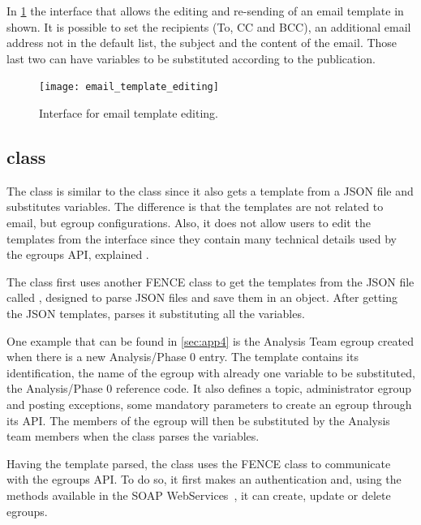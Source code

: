 In \cref{fig:email_template_editing} the interface that allows the editing and re-sending of an email template in shown. It is possible to set the recipients (To, CC and BCC), an additional email address not in the default list, the subject and the content of the email.
Those last two can have variables to be substituted according to the publication.

\begin{figure}[htb]
  \centering
  \texttt{[image: email\_template\_editing]}
  \caption{Interface for email template editing.}%
  \label{fig:email_template_editing}
\end{figure}


\subsection{ class}%
\label{sec:EgroupManager_class}

The  class is similar to the  class since it also gets a template from a JSON file and substitutes variables.
The difference is that the templates are not related to email, but egroup configurations.
Also, it does not allow users to edit the templates from the interface since they contain many technical details used by the egroups API, explained .

The  class first uses another FENCE class to get the templates from the JSON file called , designed to parse JSON files and save them in an object.
After getting the JSON templates,  parses it substituting all the variables.

One example that can be found in \cref{sec:app4} is the Analysis Team egroup created when there is a new Analysis/Phase 0 entry.
The template contains its identification, the name of the egroup with already one variable to be substituted, the Analysis/Phase 0 reference code.
It also defines a topic, administrator egroup and posting exceptions, some mandatory parameters to create an egroup through its API\@.
The members of the egroup will then be substituted by the Analysis team members when the  class parses the variables.

Having the template parsed, the  class uses the FENCE  class to communicate with the egroups API\@.
To do so, it first makes an authentication and, using the methods available in the SOAP WebServices~\cite{egroups}, it can create, update or delete egroups.


